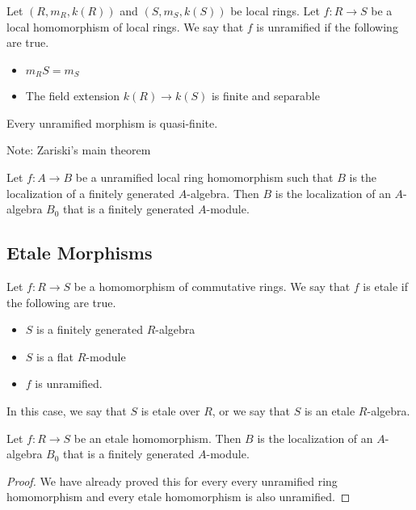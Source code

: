 \documentclass[a4paper]{article}
\begin{document}
\begin{defn}{}{} Let $(R,m_R,k(R))$ and $(S,m_S,k(S))$ be local rings. Let $f:R\to S$ be a local homomorphism of local rings. We say that $f$ is unramified if the following are true. 
\begin{itemize}
\item $m_RS=m_S$
\item The field extension $k(R)\to k(S)$ is finite and separable
\end{itemize}
\end{defn}

\begin{lmm}{}{} Every unramified morphism is quasi-finite. 
\end{lmm}

Note: Zariski's main theorem

\begin{prp}{}{} Let $f:A\to B$ be a unramified local ring homomorphism such that $B$ is the localization of a finitely generated $A$-algebra. Then $B$ is the localization of an $A$-algebra $B_0$ that is a finitely generated $A$-module. 
\end{prp}

\subsection{Etale Morphisms}
\begin{defn}{}{} Let $f:R\to S$ be a homomorphism of commutative rings. We say that $f$ is etale if the following are true. 
\begin{itemize}
\item $S$ is a finitely generated $R$-algebra
\item $S$ is a flat $R$-module
\item $f$ is unramified. 
\end{itemize}
In this case, we say that $S$ is etale over $R$, or we say that $S$ is an etale $R$-algebra. 
\end{defn}

\begin{crl}{}{} Let $f:R\to S$ be an etale homomorphism. Then $B$ is the localization of an $A$-algebra $B_0$ that is a finitely generated $A$-module. \tcbline
\begin{proof}
We have already proved this for every every unramified ring homomorphism and every etale homomorphism is also unramified. 
\end{proof}
\end{crl}
\end{document}
